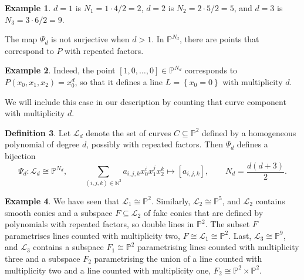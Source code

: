 \documentclass{article}
\newcommand{\N}{\mathbb{N}}
\renewcommand{\P}{\mathbb{P}}
\newcommand{\rb}[1]{\left( #1 \right)}
\renewcommand{\sb}[1]{\left[ #1 \right]}
\newcommand{\cb}[1]{\left\{ #1 \right\}}
\theoremstyle{definition}\newtheorem{definition}{Definition}[section]
\theoremstyle{definition}\newtheorem{notation}[definition]{Notation}
\theoremstyle{definition}\newtheorem{remark}[definition]{Remark}
\theoremstyle{definition}\newtheorem{example}[definition]{Example}
\theoremstyle{definition}\newtheorem{fact}{Fact}
\theoremstyle{definition}\newtheorem{exercise}{Exercise}
\begin{document}
\begin{example}
$ d = 1 $ is $ N_1 = 1 \cdot 4 / 2 = 2 $, $ d = 2 $ is $ N_2 = 2 \cdot 5 / 2 = 5 $, and $ d = 3 $ is $ N_3 = 3 \cdot 6 / 2 = 9 $.
\end{example}

The map $ \Psi_d $ is not surjective when $ d > 1 $. In $ \P^{N_d} $, there are points that correspond to $ P $ with repeated factors.

\begin{example}
Indeed, the point $ \sb{1, 0, \dots, 0} \in \P^{N_d} $ corresponds to $ P\rb{x_0, x_1, x_2} = x_0^d $, so that it defines a line $ L = \cb{x_0 = 0} $ with multiplicity $ d $.
\end{example}

We will include this case in our description by counting that curve component with multiplicity $ d $.

\begin{definition}
Let $ \mathcal{L}_d $ denote the set of curves $ C \subseteq \P^2 $ defined by a homogeneous polynomial of degree $ d $, possibly with repeated factors. Then $ \Psi_d $ defines a bijection
$$ \Psi_d : \mathcal{L}_d \cong \P^{N_d}, \qquad \sum_{\rb{i, j, k} \in \N^3} a_{i, j, k}x_0^ix_1^jx_2^k \mapsto \sb{a_{i, j, k}}, \qquad N_d = \dfrac{d\rb{d + 3}}{2}. $$
\end{definition}

\begin{example}
We have seen that $ \mathcal{L}_1 \cong \P^2 $. Similarly, $ \mathcal{L}_2 \cong \P^5 $, and $ \mathcal{L}_2 $ contains smooth conics and a subspace $ F \subseteq \mathcal{L}_2 $ of fake conics that are defined by polynomials with repeated factors, so double lines in $ \P^2 $. The subset $ F $ parametrises lines counted with multiplicity two, $ F \cong \mathcal{L}_1 \cong \P^2 $. Last, $ \mathcal{L}_3 \cong \P^9 $, and $ \mathcal{L}_3 $ contains a subspace $ F_1 \cong \P^2 $ parametrising lines counted with multiplicity three and a subspace $ F_2 $ parametrising the union of a line counted with multiplicity two and a line counted with multiplicity one, $ F_2 \cong \P^2 \times \P^2 $.
\end{example}
\end{document}

